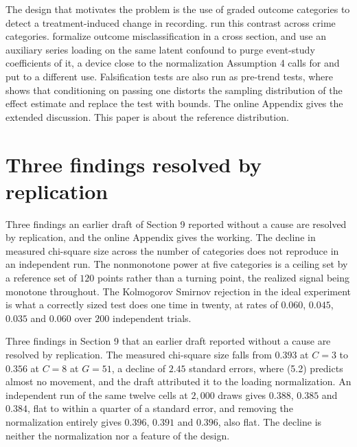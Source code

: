 \documentclass[12pt]{article}
\theoremstyle{definition}
\numberwithin{equation}{section}
\begin{document}
The design that motivates the problem is the use of graded outcome categories to
detect a treatment-induced change in recording. \citet{weisburd2024crs} run this
contrast across crime categories. \citet{hausman1998misclassification} formalize
outcome misclassification in a cross section, and \citet{fhs2019pretrends} use an
auxiliary series loading on the same latent confound to purge event-study coefficients of it, a device close to the normalization Assumption 4
calls for and put to a different use. Falsification tests are also run as pre-trend tests, where \citet{roth2022pretest} shows that conditioning on passing one
distorts the sampling distribution of the effect estimate and
\citet{rambachan2023credible} replace the test with bounds. The online Appendix gives
the extended discussion. This paper is about the reference distribution.

\section{Three findings resolved by replication}

Three findings an earlier draft of Section 9 reported without a cause are resolved by replication, and the online Appendix gives the working. The decline in measured chi-square size across the number of categories does not reproduce in an independent run. The nonmonotone power at five categories is a ceiling set by a reference set of $120$ points rather than a turning point, the realized signal being monotone throughout. The Kolmogorov Smirnov rejection in the ideal experiment is what a correctly sized test does one time in twenty, at rates of $0.060$, $0.045$, $0.035$ and $0.060$ over $200$ independent trials.

Three findings in Section 9 that an earlier draft reported without
a cause are resolved by replication. The measured chi-square size falls from
$0.393$ at $C = 3$ to $0.356$ at $C = 8$ at $G = 51$, a decline of $2.45$
standard errors, where (5.2) predicts almost no movement, and the
draft attributed it to the loading normalization. An independent run of the same
twelve cells at $2{,}000$ draws gives $0.388$, $0.385$ and $0.384$, flat to
within a quarter of a standard error, and removing the normalization entirely
gives $0.396$, $0.391$ and $0.396$, also flat. The decline is neither the
normalization nor a feature of the design.
\end{document}
